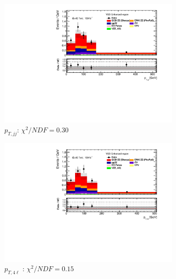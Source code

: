\begin{figure}[!htb]
\begin{subfigure}{.49\textwidth}
        \includegraphics[width=.98\linewidth]{figures/Results/RecoDist_VBSEnhanced/reco_ptjj_SR.pdf}
        \caption{ \footnotesize{$p_{T,jj}$}: $\chi^2/NDF = 0.30$ }
    \end{subfigure}
    \begin{subfigure}{.49\textwidth}
        \centering
        \includegraphics[width=.98\linewidth]{figures/Results/RecoDist_VBSEnhanced/reco_pt4l_SR.pdf}
        \caption{ \footnotesize{$p_{T,4\ell}$ }: $\chi^2/NDF = 0.15$ }
    \end{subfigure}\\
    \begin{subfigure}{.49\textwidth}
        \centering

\end{subfigure}
\end{figure}
